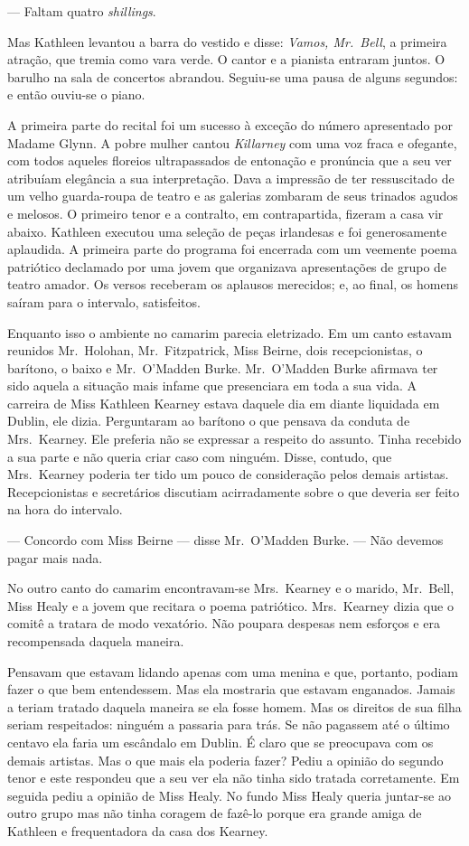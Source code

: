 --- Faltam quatro \textit{shillings}.

Mas Kathleen levantou a barra do vestido e disse: \textit{Vamos, Mr.~Bell}, a
primeira atração, que tremia como vara verde.  O cantor e a pianista entraram
juntos.  O barulho na sala de concertos abrandou.  Seguiu-se uma pausa de
alguns segundos: e então ouviu-se o piano.

A primeira parte do recital foi um sucesso à exceção do número apresentado por
Madame Glynn.  A pobre mulher cantou \textit{Killarney} com uma voz fraca e
ofegante, com todos aqueles floreios ultrapassados de entonação e pronúncia que
a seu ver atribuíam elegância a sua interpretação.  Dava a impressão de ter
ressuscitado de um velho guarda-roupa de teatro e as galerias zombaram de seus
trinados agudos e melosos.  O primeiro tenor e a contralto, em contrapartida,
fizeram a casa vir abaixo.  Kathleen executou uma seleção de peças irlandesas e
foi generosamente aplaudida.  A primeira parte do programa foi encerrada com um
veemente poema patriótico declamado por uma jovem que organizava apresentações
de grupo de teatro amador.  Os versos receberam os aplausos merecidos; e, ao
final, os homens saíram para o intervalo, satisfeitos.

Enquanto isso o ambiente no camarim parecia eletrizado.  Em um canto estavam
reunidos Mr.~Holohan, Mr.~Fitzpatrick, Miss Beirne, dois recepcionistas, o
barítono, o baixo e Mr.~O’Madden Burke.  Mr.~O’Madden Burke afirmava ter sido
aquela a situação mais infame que presenciara em toda a sua vida.  A carreira
de Miss Kathleen Kearney estava daquele dia em diante liquidada em Dublin, ele
dizia.  Perguntaram ao barítono o que pensava da conduta de Mrs.~Kearney.  Ele
preferia não se expressar a respeito do assunto.  Tinha recebido a sua parte e
não queria criar caso com ninguém.  Disse, contudo, que Mrs.~Kearney poderia
ter tido um pouco de consideração pelos demais artistas.  Recepcionistas e
secretários discutiam acirradamente sobre o que deveria ser feito na hora do
intervalo.

--- Concordo com Miss Beirne --- disse Mr.~O’Madden Burke.  --- Não devemos
pagar mais nada.

No outro canto do camarim encontravam-se Mrs.~Kearney e o marido, Mr.~Bell,
Miss Healy e a jovem que recitara o poema patriótico.  Mrs.~Kearney dizia que
o comitê a tratara de modo vexatório.  Não poupara despesas nem esforços e era
recompensada daquela maneira.  

Pensavam que estavam lidando apenas com uma menina e que, portanto, podiam
fazer o que bem entendessem.  Mas ela mostraria que estavam enganados.  Jamais
a teriam tratado daquela maneira se ela fosse homem.  Mas os direitos de sua
filha seriam respeitados: ninguém a passaria para trás.  Se não pagassem até o
último centavo ela faria um escândalo em Dublin.  É claro que se preocupava com
os demais artistas.  Mas o que mais ela poderia fazer?  Pediu a opinião do
segundo tenor e este respondeu que a seu ver ela não tinha sido tratada
corretamente.  Em seguida pediu a opinião de Miss Healy.  No fundo Miss Healy
queria juntar-se ao outro grupo mas não tinha coragem de fazê-lo porque era
grande amiga de Kathleen e frequentadora da casa dos Kearney.

